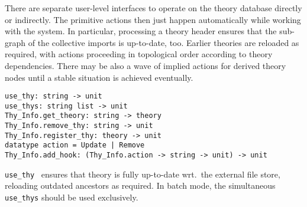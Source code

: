 \begin{isabellebody}
\begin{isamarkuptext}
  \medskip There are separate user-level interfaces to operate on the
  theory database directly or indirectly.  The primitive actions then
  just happen automatically while working with the system.  In
  particular, processing a theory header  ensures that the
  sub-graph of the collective imports 
  is up-to-date, too.  Earlier theories are reloaded as required, with
   actions proceeding in topological order according to
  theory dependencies.  There may be also a wave of implied  actions for derived theory nodes until a stable situation
  is achieved eventually.%
\end{isamarkuptext}%
\isamarkuptrue%
%
\isadelimmlref
%
\endisadelimmlref
%
\isatagmlref
%
\begin{isamarkuptext}%
\begin{mldecls}
  \verb|use_thy: string -> unit| \\
  \verb|use_thys: string list -> unit| \\
  \verb|Thy_Info.get_theory: string -> theory| \\
  \verb|Thy_Info.remove_thy: string -> unit| \\[1ex]
  \verb|Thy_Info.register_thy: theory -> unit| \\[1ex]
  \verb|datatype action = Update |\verb,|,\verb| Remove| \\
  \verb|Thy_Info.add_hook: (Thy_Info.action -> string -> unit) -> unit| \\
  \end{mldecls}

  \begin{description}

  \item \verb|use_thy|~ ensures that theory  is fully
  up-to-date wrt.\ the external file store, reloading outdated
  ancestors as required.  In batch mode, the simultaneous \verb|use_thys| should be used exclusively.


\end{description}
\end{isamarkuptext}
\end{isabellebody}
